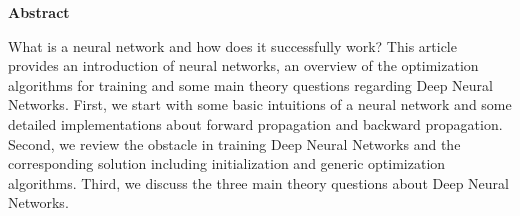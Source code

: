 \begin{center}
    \bfseries {} Abstract
\end{center}

\par What is a neural network and how does it successfully work? 
This article provides an introduction of neural networks, an
overview of the optimization algorithms for training and some
main theory questions regarding Deep Neural Networks. First, we
start with some basic intuitions of a neural network and some detailed
implementations about forward propagation and backward propagation. 
Second, we review the obstacle in training Deep Neural Networks and 
the corresponding solution including initialization and generic optimization
algorithms. Third, we discuss the three main theory questions about 
Deep Neural Networks.

